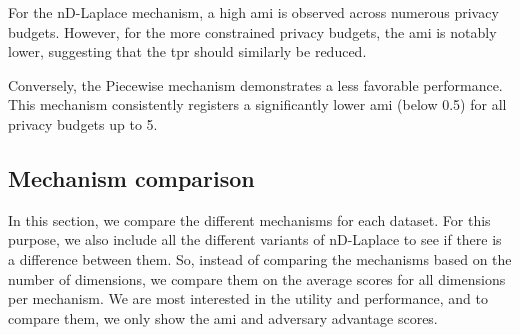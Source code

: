 For the nD-Laplace mechanism, a high \gls{ami} is observed across numerous privacy budgets. However, for the more constrained privacy budgets, the \gls{ami} is notably lower, suggesting that the \gls{tpr} should similarly be reduced.

Conversely, the Piecewise mechanism demonstrates a less favorable performance. This mechanism consistently registers a significantly lower \gls{ami} (below 0.5) for all privacy budgets up to 5.

\subsection{Mechanism comparison}
In this section, we compare the different mechanisms for each dataset.
For this purpose, we also include all the different variants of nD-Laplace to see if there is a difference between them.
So, instead of comparing the mechanisms based on the number of dimensions, we compare them on the average scores for all dimensions per mechanism.
We are most interested in the utility and performance, and to compare them, we only show the \gls{ami} and adversary advantage scores.
\newpage
